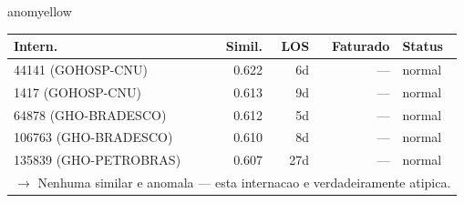 \documentclass[a4paper,10pt]{article}
\begin{document}
\begin{anomalycard}[Internacao 1219 | GHO-UNIMEDVITORIA2 | MODERADO (z=2.31)]{anomyellow}
\begin{tabular}{l r r r l}\toprule\textbf{Intern.} & \textbf{Simil.} & \textbf{LOS} & \textbf{Faturado} & \textbf{Status} \\\midrule
44141 (GOHOSP-CNU) & 0.622 & 6d & --- & \textcolor{jcubeblue}{normal} \\
1417 (GOHOSP-CNU) & 0.613 & 9d & --- & \textcolor{jcubeblue}{normal} \\
64878 (GHO-BRADESCO) & 0.612 & 5d & --- & \textcolor{jcubeblue}{normal} \\
106763 (GHO-BRADESCO) & 0.610 & 8d & --- & \textcolor{jcubeblue}{normal} \\
135839 (GHO-PETROBRAS) & 0.607 & 27d & --- & \textcolor{jcubeblue}{normal} \\
\multicolumn{5}{l}{\textcolor{jcubeblue}{\small $\rightarrow$ Nenhuma similar e anomala --- esta internacao e verdadeiramente atipica.}} \\
\bottomrule\end{tabular}


\end{anomalycard}

\newpage
\end{document}
